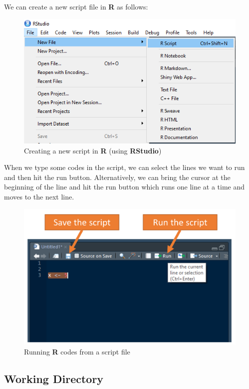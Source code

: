 \documentclass[]{book}
\begin{document}
We can create a new script file in \textbf{R} as follows:

\begin{figure}
\centering
\includegraphics{figure/img5.png}
\caption{Creating a new script in \textbf{R} (using \textbf{RStudio})}
\end{figure}

When we type some codes in the script, we can select the lines we want to run and then hit the run button. Alternatively, we can bring the cursor at the beginning of the line and hit the run button which runs one line at a time and moves to the next line.

\begin{figure}
\centering
\includegraphics{figure/img7.png}
\caption{Running \textbf{R} codes from a script file}
\end{figure}

\hypertarget{working-directory}{%
\subsection{Working Directory}\label{working-directory}}
\end{document}
